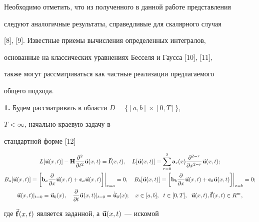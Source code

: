  


Необходимо отметить, что из полученного в данной работе представления 


следуют аналогичные результаты, справедливые для скалярного случая 


[8], [9]. Известные приемы вычисления определенных интегралов, 


основанные на классических уравнениях Бесселя и Гаусса [10], [11], 


также могут рассматриваться как частные реализации предлагаемого 


общего подхода. 


\medskip 


 


{\bf 1.} Будем рассматривать в области $D=\{[a,b]\times[0,T]\}$, 


$T<\infty$, начально-краевую задачу в 


стандартной форме [12] 


\begin{gather} 


L[\vb{u}(x,t)]-\bold H\frac{\partial^2}{\partial t^2}\vb{u}(x,t)= 


\vb{f}(x,t),\quad L[\vb{u}(x,t)]\equiv\sum^2_{r=0} 


\bold a_r(x)\frac{\partial^{2-r}}{\partial x^{2-r}}\vb{u} 


(x,t);\notag \\ 


% 


B_a[\vb{u}(x,t)]\equiv\bigg[\bold b_a\frac{\partial}{\partial x} 


\vb{u}(x,t)+\bold c_a\vb{u}(x,t)\bigg]\bigg|_{x=a}=0,\quad 


B_b[\vb{u}(x,t)]\equiv\bigg[\bold b_b 


\frac{\partial}{\partial x}\vb{u}(x,t)+\bold c_b 


\vb{u}(x,t)\bigg]\bigg|_{x=b}=0; \\ 


% 


\vb{u}(x,t)|_{t=0}=\vb{u}_0(x),\quad 


\frac{\partial}{\partial t}\vb{u}(x,t)|_{t=0}=\Dot{\vb{u}}_0(x); 


\quad x\in[a,b],\ \; t\in[0,T],\ \; \vb{u}(x,t), 


\vb{f}(x,t)\in R^m,\notag 


\end{gather} 


где $\Vec{\bold{f}}(x,t)$ является заданной, а $\Vec{\bold{u}}(x,t)$ --- искомой 


